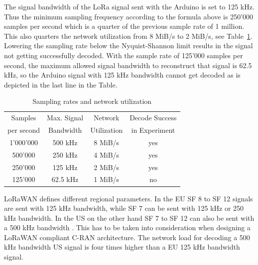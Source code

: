 The signal bandwidth of the LoRa signal sent with the Arduino is set to 125 kHz. Thus the minimum sampling frequency according to the formula above
is 250'000 samples per second which is a quarter of the previous sample rate of 1 million. This also quarters the network utilization from 8 MiB/s to 2 MiB/s, see Table~\ref{tabl:samprates}.
Lowering the sampling rate below the Nyquist-Shannon limit results in the signal not getting successfully decoded.
With the sample rate of 125'000 samples per second, the maximum allowed signal bandwidth to reconstruct that signal is 62.5 kHz, so the Arduino signal with 125 kHz bandwidth 
cannot get decoded as is depicted in the last line in the Table.

\begin{table}[h]
    \centering
    \setlength{\tabcolsep}{22pt}
    \renewcommand{\arraystretch}{1.2}
    \begin{tabular}{cccc}
        \toprule
        Samples & Max. Signal & Network & Decode Success \\
        per second & Bandwidth & Utilization & in Experiment\\
        \midrule
        1'000'000  &500 kHz & 8 MiB/s    &yes\\
        500'000  &250 kHz & 4 MiB/s    &yes\\
        250'000&  125 kHz&  2 MiB/s  & yes\\
        125'000 & 62.5 kHz & 1 MiB/s & no\\
        \bottomrule
       \end{tabular}
\caption{Sampling rates and network utilization}
\label{tabl:samprates}
\end{table}

LoRaWAN defines different regional parameters. In the EU SF 8 to SF 12 signals are sent with 125 kHz bandwidth, while SF 7
can be sent with 125 kHz or 250 kHz bandwidth. In the US on the other hand SF 7 to SF 12 can also be sent with
a 500 kHz bandwidth \cite{lora_wan_reg_params}.
This has to be taken into consideration when designing a LoRaWAN compliant C-RAN architecture.
The network load for decoding a 500 kHz bandwidth US signal is four times higher than a EU 125 kHz bandwidth signal.

